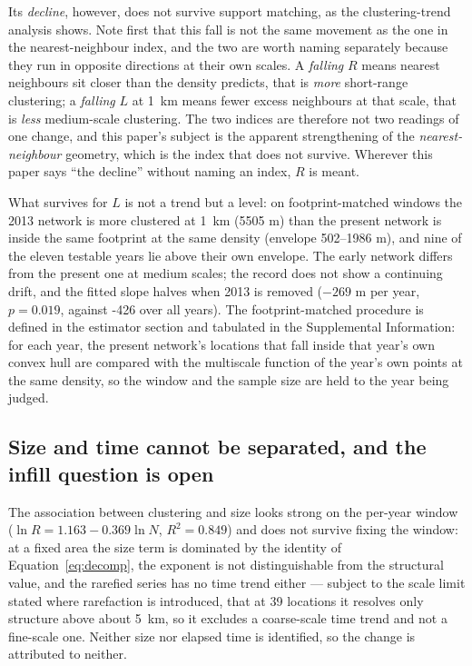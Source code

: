 \documentclass[fleqn,10pt,lineno]{wlpeerj}
\newcommand{\rRareLocN}{39}
\newcommand{\lKmExact}{-426}
\begin{document}
Its \emph{decline}, however, does not survive support matching, as
the clustering-trend analysis shows. Note first that this fall is not the same movement as the
one in the nearest-neighbour index, and the two are worth naming separately because they run in
opposite directions at their own scales. A \emph{falling} $R$ means nearest neighbours sit
closer than the density predicts, that is \emph{more} short-range clustering; a \emph{falling}
$L$ at \SI{1}{\kilo\meter} means fewer excess neighbours at that scale, that is \emph{less}
medium-scale clustering. The two indices are therefore not two readings of one change, and
this paper's subject is the apparent strengthening of the \emph{nearest-neighbour} geometry,
which is the index that does not survive. Wherever this paper says ``the decline'' without naming
an index, $R$ is meant.

What survives for $L$ is not a trend but a level: on
footprint-matched windows the 2013 network is more clustered at \SI{1}{\kilo\meter}
(\num{5505} m) than the present network is inside the same footprint at the same density
(envelope \num{502}--\num{1986} m), and nine of the eleven testable years lie above their own
envelope. The early network differs from the present one at medium scales; the record does not
show a continuing drift, and the fitted slope halves when 2013 is removed
($-269$ m per year, $p = 0.019$, against \lKmExact{} over all years). The footprint-matched
procedure is defined in the estimator section and tabulated in the Supplemental Information:
for each year, the present network's locations that fall inside that year's own convex hull are
compared with the multiscale function of the year's own points at the same density, so the window
and the sample size are held to the year being judged.

\subsection*{Size and time cannot be separated, and the infill question is open}
\label{sec:results-powerlaw}

The association between clustering and size looks strong on the per-year window
($\ln R = 1.163 - 0.369\ln N$, $R^2 = 0.849$) and does not survive fixing the window: at a fixed
area the size term is dominated by the identity of Equation~\eqref{eq:decomp}, the exponent is
not distinguishable from the structural value, and the rarefied series has no time trend
either --- subject to the scale limit stated where rarefaction is introduced, that at
\rRareLocN{} locations it resolves only structure above about \SI{5}{\kilo\meter}, so it
excludes a coarse-scale time trend and not a fine-scale one.
Neither size nor elapsed time is identified, so the change is attributed to neither.
\end{document}
